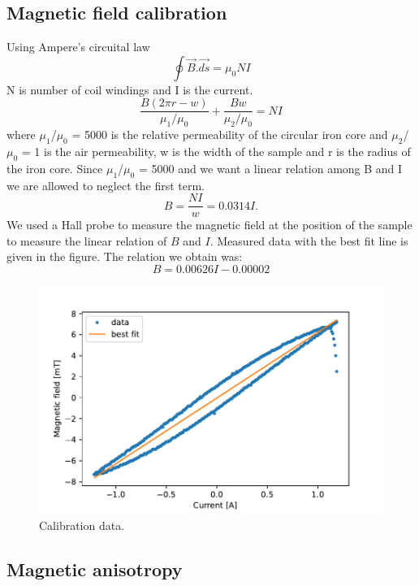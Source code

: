 \documentclass{article}
\begin{document}
\subsection{Magnetic field calibration}
Using Ampere's circuital law  \\
\begin{equation}
    \oint \vec{B}.\vec{ds} = \mu_{0}NI
\end{equation}
N is number of coil windings and I is the current. \\
\begin{equation}
\frac{B(2\pi r - w) }{\mu_{1}/\mu_{0}} + \frac{Bw}{\mu_{2}/\mu_{0}} = NI
\end{equation}
where $\mu_1$/$\mu_0$ = 5000 is the relative permeability of the 
circular iron core and $\mu_2$/$\mu_0$ = 1 is the air permeability, w is 
the width of the sample and r is the radius of the iron core. 
Since $\mu_1$/$\mu_0$ = 5000 and we want a linear relation among 
B and I we are allowed to neglect the ﬁrst term.
\begin{equation}
B = \frac{NI}{w} = 0.0314 I.    
\end{equation}
We used a Hall probe to measure the magnetic field at the position of the sample to measure the linear relation of $B$ and $I$. Measured data with the best fit line is given in the figure. The relation we obtain was:
\begin{equation}
    B =  0.00626 I - 0.00002
\end{equation}

\begin{figure}[h!]
\centering
\includegraphics[width=0.7\linewidth]{LAB/MOKE/calibration.pdf}
\caption{Calibration data.}
\label{fig:exp_setup}
\end{figure}

\clearpage
\subsection{Magnetic anisotropy}
\end{document}
